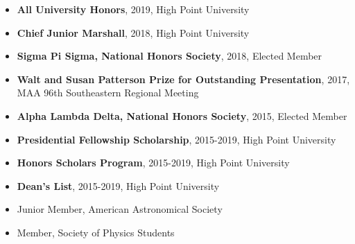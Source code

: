\documentclass[letterpaper,12pt]{article}
\begin{document}
\vspace{-2mm}
\begin{itemize}
    \item \textbf{All University Honors}, 2019, High Point University\vspace{-3mm}
    \item \textbf{Chief Junior Marshall}, 2018, High Point University\vspace{-3mm}
    \item \textbf{Sigma Pi Sigma, National Honors Society}, 2018, Elected Member\vspace{-3mm}
    \item \textbf{Walt and Susan Patterson Prize for Outstanding Presentation}, 2017, MAA 96th Southeastern Regional Meeting\vspace{-3mm}
    \item \textbf{Alpha Lambda Delta, National Honors Society}, 2015, Elected Member\vspace{-3mm}
    \item \textbf{Presidential Fellowship Scholarship}, 2015-2019, High Point University\vspace{-3mm}
    \item \textbf{Honors Scholars Program}, 2015-2019, High Point University\vspace{-3mm}
    \item \textbf{Dean’s List}, 2015-2019, High Point University\vspace{-1mm}
\end{itemize}

\vspace{3mm}
\noindent{}

\vspace{-2mm}
\begin{itemize}
    \item Junior Member, American Astronomical Society\vspace{-3mm}
    \item Member, Society of Physics Students\vspace{-1mm}
    
\end{itemize}
\end{document}
